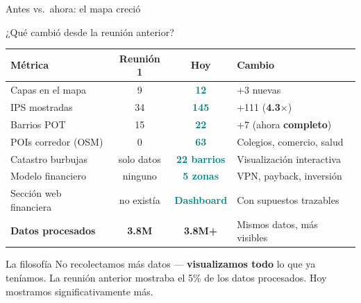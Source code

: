\documentclass[aspectratio=169, 11pt]{beamer}
\newcommand{\highlight}[1]{\textcolor{teal}{\textbf{#1}}}
\begin{document}
{
\begin{frame}{Antes vs.\ ahora: el mapa creció}

\begin{center}
\large ¿Qué cambió desde la reunión anterior?
\end{center}

\vspace{10pt}
\begin{center}
{\small
\begin{tabular}{@{}l c c l@{}}
\toprule
\textbf{Métrica} & \textbf{Reunión 1} & \textbf{Hoy} & \textbf{Cambio} \\
\midrule
Capas en el mapa & 9 & \highlight{12} & +3 nuevas \\
IPS mostradas & 34 & \highlight{145} & +111 (\textbf{4.3$\times$}) \\
Barrios POT & 15 & \highlight{22} & +7 (ahora \textbf{completo}) \\
POIs corredor (OSM) & 0 & \highlight{63} & Colegios, comercio, salud \\
Catastro burbujas & solo datos & \highlight{22 barrios} & Visualización interactiva \\
Modelo financiero & ninguno & \highlight{5 zonas} & VPN, payback, inversión \\
Sección web financiera & no existía & \highlight{Dashboard} & Con supuestos trazables \\
\midrule
\textbf{Datos procesados} & \textbf{3.8M} & \textbf{3.8M+} & Mismos datos, más visibles \\
\bottomrule
\end{tabular}
}
\end{center}

\vspace{10pt}
\begin{exampleblock}{\small La filosofía}
\small No recolectamos más datos --- \textbf{visualizamos todo} lo que ya teníamos. La reunión anterior mostraba el 5\% de los datos procesados. Hoy mostramos significativamente más.
\end{exampleblock}
\end{frame}
}
\end{document}
